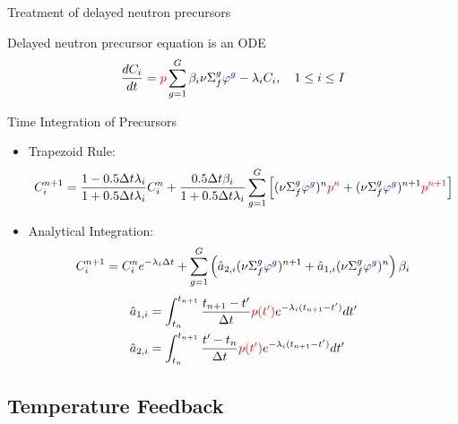 \documentclass[8pt,xcolor=dvipnames]{beamer}
\newcommand{\be}{\begin{equation*}}
\newcommand{\ee}{\end{equation*}}
\newcommand{\tcr}[1]{\textcolor{red}{#1}}
\newcommand{\tcb}[1]{\textcolor{blue}{#1}}
\begin{document}
\begin{frame}{Treatment of delayed neutron precursors}
\vspace{-3mm}
\begin{block}{Delayed neutron precursor equation is an ODE}
\begin{equation*}
\frac{dC_i}{dt} = \tcr{p}\sum_{g=1}^G \beta_i\nu \Sigma_f^g \tcb{\varphi^{g}} - \lambda_iC_i , \quad 1 \le i \le I
\end{equation*}
\end{block}

\begin{block}{Time Integration of Precursors}
\begin{itemize}
\item Trapezoid Rule:
\be
C^{n+1}_i = \frac{1-0.5\Delta t\lambda_i}{1+0.5\Delta t\lambda_i}C^n_i + \frac{0.5\Delta t \beta_i}{1+0.5\Delta t\lambda_i}\sum_{g=1}^G\left[(\nu\Sigma_f^g\tcb{\varphi^g})^n \tcr{p^n} +  (\nu\Sigma_f^g\tcb{\varphi^g})^{n+1} \tcr{p^{n+1}}\right]
\ee
\item Analytical Integration:
\be 
C^{n+1}_i = C^n_i e^{-\lambda_i \Delta t} + \sum_{g=1}^G\left(\hat{a}_{2,i} (\nu\Sigma_f^g\tcb{\varphi^g})^{n+1}+\hat{a}_{1,i} (\nu\Sigma_f^g\tcb{\varphi^g})^n\right)\beta_i
\ee
\vspace{-4mm}
\begin{align*}
&\hat{a}_{1,i}= \int_{t_n}^{t_{n+1}}\frac{t_{n+1}-t'}{\Delta t}\tcr{p(t')}e^{-\lambda_i(t_{n+1}-t')}dt' \\
&\hat{a}_{2,i} = \int_{t_n}^{t_{n+1}}\frac{t'-t_n}{\Delta t}\tcr{p(t')}e^{-\lambda_i(t_{n+1}-t')}dt'
\end{align*}
\end{itemize}
\end{block}

\end{frame}

\subsection{Temperature Feedback}
\end{document}
